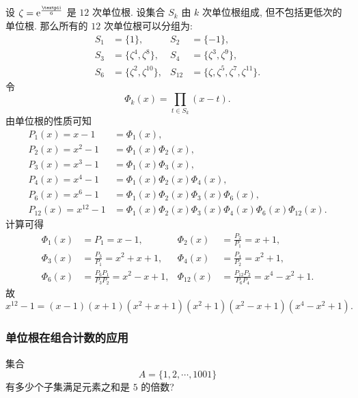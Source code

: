 \begin{solution}
  设 $\zeta=\ee^{\frac{\cpi\ii}6}$ 是 $12$ 次单位根.
  设集合 $S_k$ 由 $k$ 次单位根组成, 但不包括更低次的单位根.
  那么所有的 $12$ 次单位根可以分组为:
  \begin{align*}
    S_1&=\{1\},&
    S_2&=\{-1\},\\
    S_3&=\{\zeta^4,\zeta^8\},&
    S_4&=\{\zeta^3,\zeta^9\},\\
    S_6&=\{\zeta^2,\zeta^{10}\},&
    S_{12}&=\{\zeta,\zeta^5,\zeta^7,\zeta^{11}\}.
  \end{align*}
  令
  \[
    \Phi_k(x)=\prod_{t\in S_k}(x-t).
  \]
  由单位根的性质可知
  \begin{align*}
    P_1(x)=x-1&=\Phi_1(x),\\
    P_2(x)=x^2-1&=\Phi_1(x)\Phi_2(x),\\
    P_3(x)=x^3-1&=\Phi_1(x)\Phi_3(x),\\
    P_4(x)=x^4-1&=\Phi_1(x)\Phi_2(x)\Phi_4(x),\\
    P_6(x)=x^6-1&=\Phi_1(x)\Phi_2(x)\Phi_3(x)\Phi_6(x),\\
    P_{12}(x)=x^{12}-1&=\Phi_1(x)\Phi_2(x)\Phi_3(x)\Phi_4(x)\Phi_6(x)\Phi_{12}(x).
  \end{align*}
  计算可得
  \begin{align*}
    \Phi_1(x)&=P_1=x-1,&
    \Phi_2(x)&=\frac{P_2}{P_1}=x+1,\\
    \Phi_3(x)&=\frac{P_3}{P_1}=x^2+x+1,&
    \Phi_4(x)&=\frac{P_4}{P_2}=x^2+1,\\
    \Phi_6(x)&=\frac{P_6P_1}{P_3P_2}=x^2-x+1,&
    \Phi_{12}(x)&=\frac{P_{12}P_2}{P_6P_4}=x^4-x^2+1.
  \end{align*}
  故
  \[
    x^{12}-1=(x-1)(x+1)(x^2+x+1)(x^2+1)(x^2-x+1)(x^4-x^2+1).
  \]
\end{solution}



\subsubsection{单位根在组合计数的应用}

\begin{example}
  集合
  \[
    A=\{1,2,\cdots,1001\}
  \]
  有多少个子集满足元素之和是 $5$ 的倍数?
\end{example}

